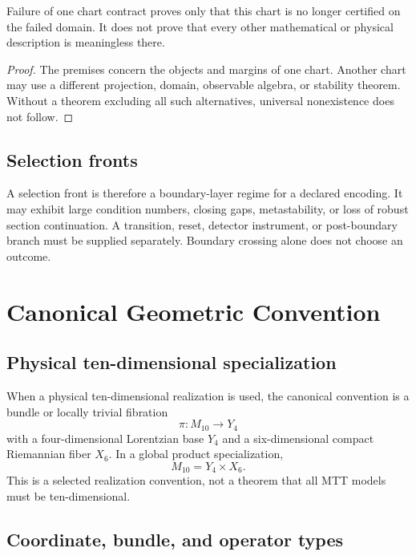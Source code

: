 \documentclass[11pt]{article}
\begin{document}
\begin{proposition}
\label{prop:boundary}
Failure of one chart contract proves only that this chart is no longer
certified on the failed domain.  It does not prove that every other
mathematical or physical description is meaningless there.
\end{proposition}

\begin{proof}
The premises concern the objects and margins of one chart.  Another chart may
use a different projection, domain, observable algebra, or stability theorem.
Without a theorem excluding all such alternatives, universal nonexistence
does not follow.
\end{proof}

\subsection{Selection fronts}

A selection front is therefore a boundary-layer regime for a declared
encoding.  It may exhibit large condition numbers, closing gaps, metastability,
or loss of robust section continuation.  A transition, reset, detector
instrument, or post-boundary branch must be supplied separately.  Boundary
crossing alone does not choose an outcome.

\section{Canonical Geometric Convention}

\subsection{Physical ten-dimensional specialization}

When a physical ten-dimensional realization is used, the canonical convention
is a bundle or locally trivial fibration
\[
\pi:M_{10}\longrightarrow Y_4
\]
with a four-dimensional Lorentzian base $Y_4$ and a six-dimensional compact
Riemannian fiber $X_6$.  In a global product specialization,
\[
M_{10}=Y_4\times X_6.
\]
This is a selected realization convention, not a theorem that all MTT models
must be ten-dimensional.

\subsection{Coordinate, bundle, and operator types}
\end{document}
